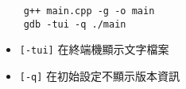 \begin{lstlisting}
    g++ main.cpp -g -o main
    gdb -tui -q ./main
\end{lstlisting}
\begin{itemize}
    \item \verb|[-tui]| 在終端機顯示文字檔案
    \item \verb|[-q]| 在初始設定不顯示版本資訊
\end{itemize}
